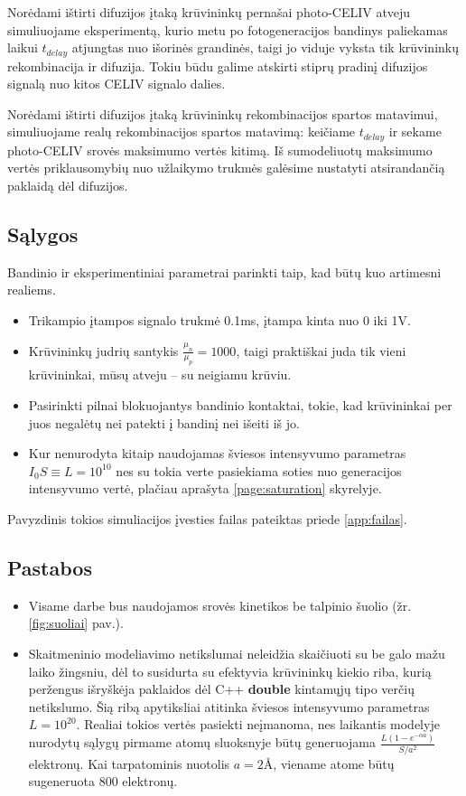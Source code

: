 Norėdami ištirti difuzijos įtaką krūvininkų pernašai photo-CELIV atveju simuliuojame eksperimentą, kurio metu po fotogeneracijos bandinys paliekamas laikui \(t_{delay}\) atjungtas nuo išorinės grandinės, taigi jo viduje vyksta tik krūvininkų rekombinacija ir difuzija. Tokiu būdu galime atskirti stiprų pradinį difuzijos signalą nuo kitos CELIV signalo dalies.

Norėdami ištirti difuzijos įtaką krūvininkų rekombinacijos spartos matavimui, simuliuojame realų rekombinacijos spartos matavimą: keičiame \(t_{delay}\) ir sekame photo-CELIV srovės maksimumo vertės kitimą. Iš sumodeliuotų maksimumo vertės priklausomybių nuo užlaikymo trukmės galėsime nustatyti atsirandančią paklaidą dėl difuzijos.

\subsection{Sąlygos}
\label{page:params}
Bandinio ir eksperimentiniai parametrai parinkti taip, kad būtų kuo artimesni realiems.
\begin{itemize}
\item Trikampio įtampos signalo trukmė 0.1ms, įtampa kinta nuo 0 iki 1V.
\item Krūvininkų judrių santykis \(\frac{\mu_n}{\mu_p} = 1000\), taigi praktiškai juda tik vieni krūvininkai, mūsų atveju -- su neigiamu krūviu. 
\item Pasirinkti pilnai blokuojantys bandinio kontaktai, tokie, kad krūvininkai per juos negalėtų nei patekti į bandinį  nei išeiti iš jo.
\item Kur nenurodyta kitaip naudojamas šviesos intensyvumo parametras \(I_0 S \equiv L = 10^{10} \) nes su tokia verte pasiekiama soties nuo generacijos intensyvumo vertė, plačiau aprašyta \ref{page:saturation} skyrelyje.
\end{itemize}
Pavyzdinis tokios simuliacijos įvesties failas pateiktas priede \ref{app:failas}.

\subsection{Pastabos}
\label{page:specials}
\begin{itemize}
\item Visame darbe bus naudojamos srovės kinetikos be talpinio šuolio (žr. \ref{fig:suoliai} pav.).
\item Skaitmeninio modeliavimo netikslumai neleidžia skaičiuoti su be galo mažu laiko žingsniu, dėl to susidurta su efektyvia krūvininkų kiekio riba, kurią peržengus išryškėja paklaidos dėl C++ \textbf{double} kintamųjų tipo verčių netikslumo. Šią ribą apytiksliai atitinka šviesos intensyvumo parametras $L=10^{20}$. Realiai tokios vertės pasiekti neįmanoma, nes laikantis modelyje nurodytų sąlygų pirmame atomų sluoksnyje būtų generuojama $\frac{L (1-e^{-\alpha a})}{S/a^2}$ elektronų. Kai tarpatominis nuotolis $a = 2$\AA, viename atome būtų sugeneruota $800$ elektronų.
\end{itemize}